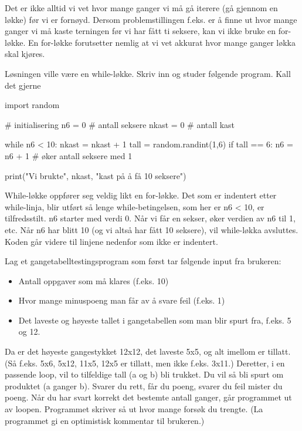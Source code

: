 {Det er ikke alltid vi vet hvor mange ganger vi må gå iterere (gå gjennom en løkke) før vi er fornøyd. Dersom problemstillingen f.eks. er å finne ut hvor mange ganger vi må kaste terningen før vi har fått ti seksere, kan vi ikke bruke en for-løkke. En for-løkke forutsetter nemlig at vi vet akkurat hvor mange ganger løkka skal kjøres.

Løsningen ville være en while-løkke. Skriv inn og studer følgende program. Kall det gjerne 

\begin{usncodebox}
import random

# initialisering
n6    = 0  # antall seksere
nkast = 0  # antall kast

while n6 < 10: 
    nkast = nkast + 1
    tall = random.randint(1,6)
    if tall == 6:
       n6 = n6 + 1    # øker antall seksere med 1
    
print("Vi brukte", nkast, "kast på å få 10 seksere")
\end{usncodebox}

While-løkke oppfører seg veldig likt en for-løkke. Det som er indentert etter while-linja, blir utført så lenge while-betingelsen, som her er n6 < 10, er tilfredsstilt. n6 starter med verdi 0. Når vi får en sekser, øker verdien av n6 til 1, etc. Når n6 har blitt 10 (og vi altså har fått 10 seksere), vil while-løkka avsluttes. Koden går videre til linjene nedenfor som ikke er indentert. 

\begin{question}
Lag et gangetabelltestingsprogram som først tar følgende input fra brukeren:
\begin{itemize}
\item Antall oppgaver som må klares (f.eks. 10)
\item Hvor mange minuspoeng man får av å svare feil (f.eks. 1)
\item Det laveste og høyeste tallet i gangetabellen som man blir spurt fra, f.eks. 5 og 12.
\end{itemize}
Da er det høyeste gangestykket 12x12, det laveste 5x5, og alt imellom er tillatt. (Så f.eks. 5x6, 5x12, 11x5, 12x5 er tillatt, men ikke f.eks. 3x11.) Deretter, i en passende loop, vil to tilfeldige tall (a og b) bli trukket. Du vil så bli spurt om produktet (a ganger b). Svarer du rett, får du poeng, svarer du feil mister du poeng. Når du har svart korrekt det bestemte antall ganger, går programmet ut av loopen. Programmet skriver så ut hvor mange forsøk du trengte. (La programmet gi en optimistisk kommentar til brukeren.) 
\end{question}

}
